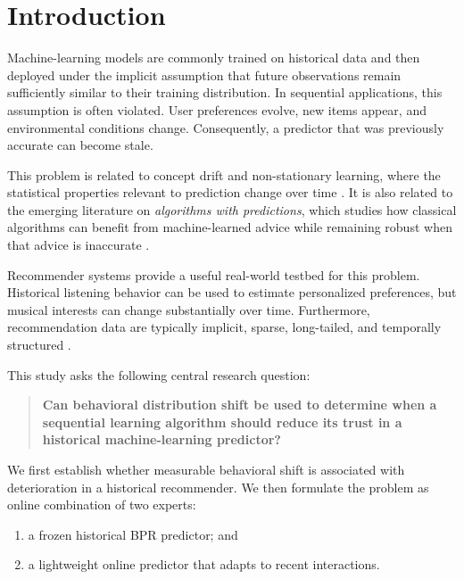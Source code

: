 \documentclass[11pt]{article}
\begin{document}

\section{Introduction}

Machine-learning models are commonly trained on historical data and
then deployed under the implicit assumption that future observations
remain sufficiently similar to their training distribution. In
sequential applications, this assumption is often violated. User
preferences evolve, new items appear, and environmental conditions
change. Consequently, a predictor that was previously accurate can
become stale.

This problem is related to concept drift and non-stationary learning,
where the statistical properties relevant to prediction change over
time \citep{gama2014survey}. It is also related to the emerging
literature on \emph{algorithms with predictions}, which studies how
classical algorithms can benefit from machine-learned advice while
remaining robust when that advice is inaccurate
\citep{lykouris2018competitive,mitzenmacher2022algorithms}.

Recommender systems provide a useful real-world testbed for this
problem. Historical listening behavior can be used to estimate
personalized preferences, but musical interests can change
substantially over time. Furthermore, recommendation data are typically
implicit, sparse, long-tailed, and temporally structured
\citep{adomavicius2005toward,celma2010music}.

This study asks the following central research question:

\begin{quote}
\textbf{Can behavioral distribution shift be used to determine when a
sequential learning algorithm should reduce its trust in a historical
machine-learning predictor?}
\end{quote}

We first establish whether measurable behavioral shift is associated
with deterioration in a historical recommender. We then formulate the
problem as online combination of two experts:

\begin{enumerate}[label=(\roman*)]
    \item a frozen historical BPR predictor; and
    \item a lightweight online predictor that adapts to recent
    interactions.
\end{enumerate}
\end{document}
